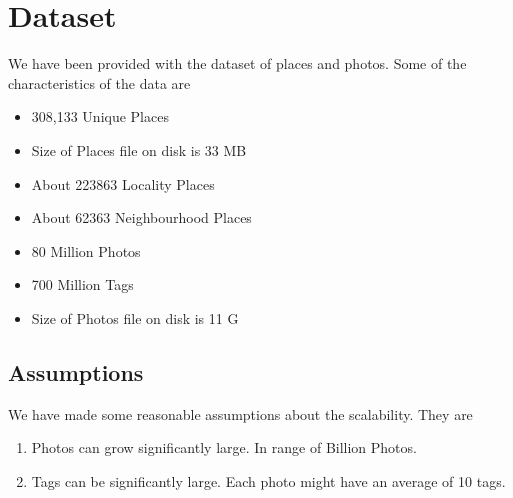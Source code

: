 \chapter{Dataset}

	We have been provided with the dataset of places and photos. Some of the characteristics of the data are
	\begin{itemize}
	\item 308,133 Unique Places
	\item Size of Places file on disk is 33 MB 
	\item About 223863 Locality Places
	\item About 62363 Neighbourhood Places
	\item 80 Million Photos
	\item 700 Million Tags
	\item Size of Photos file on disk is 11 G
	\end{itemize}
	
\section{Assumptions}
	
	We have made some reasonable assumptions about the scalability. They are
	\begin{enumerate}
	\item Photos can grow significantly large. In range of Billion Photos.
	\item Tags can be significantly large. Each photo might have an average of 10 tags. 
	\end{enumerate}

	
